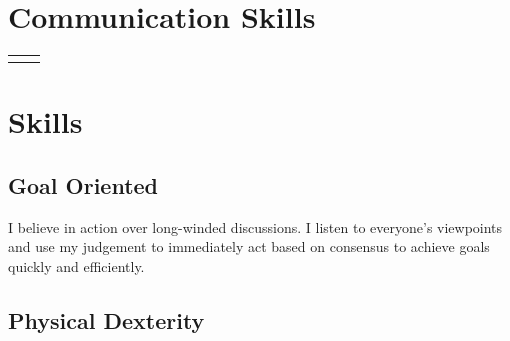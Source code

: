 \documentclass[
	10pt, %
]{FreemanCV}
\begin{document}
\begin{paracol}{2}
\section{Communication Skills}




\begin{supertabular}{r l} %
	
	
	
	
	
	
\end{supertabular}


\section{Skills}

\subsection{Goal Oriented}

I believe in action over long-winded discussions. I listen to everyone's viewpoints and use my judgement to immediately act based on consensus to achieve goals quickly and efficiently.

\subsection{Physical Dexterity}


\end{paracol}
\end{document}
